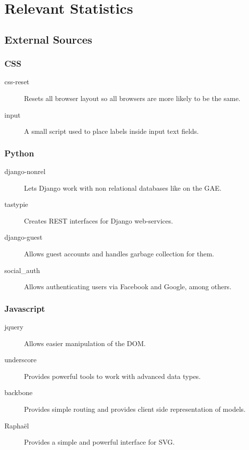 \section{Relevant Statistics}
\subsection{External Sources}
\subsubsection{CSS}
\begin{description}
	\item[css-reset] Resets all browser layout so all browsers are more likely to be the same.
	\item[input] A small script used to place labels inside input text fields.
\end{description}
	
\subsubsection{Python}
\begin{description}
	\item[django-nonrel] Lets Django work with non relational databases like on the GAE.
	\item[tastypie] Creates REST interfaces for Django web-services.
	\item[django-guest] Allows guest accounts and handles garbage collection for them.
	\item[social{\_}auth] Allows authenticating users via Facebook and Google, among others.
\end{description}

\subsubsection{Javascript}
\begin{description}
	\item[jquery] Allows easier manipulation of the DOM.
	\item[underscore] Provides powerful tools to work with advanced data types.
	\item[backbone] Provides simple routing and provides client side representation of models.
	\item[Rapha\"{e}l] Provides a simple and powerful interface for SVG.
\end{description}

